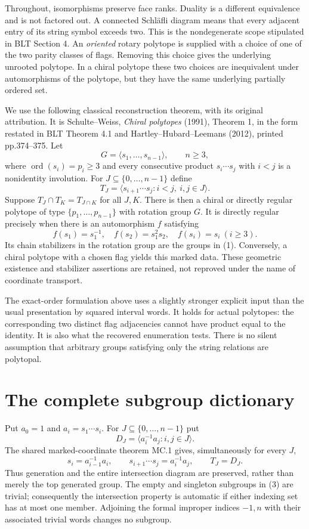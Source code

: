\documentclass[11pt]{article}
\theoremstyle{remark}\newtheorem{remark}[theorem]{Remark}
\newcommand{\ord}{\operatorname{ord}}
\begin{document}
Throughout, isomorphisms preserve face ranks. Duality is a different equivalence and is not factored out. A connected Schl\"afli diagram means that every adjacent entry of its string symbol exceeds two. This is the nondegenerate scope stipulated in BLT Section 4. An \emph{oriented} rotary polytope is supplied with a choice of one of the two parity classes of flags. Removing this choice gives the underlying unrooted polytope. In a chiral polytope these two choices are inequivalent under automorphisms of the polytope, but they have the same underlying partially ordered set.

We use the following classical reconstruction theorem, with its original attribution. It is Schulte--Weiss, \emph{Chiral polytopes} (1991), Theorem 1, in the form restated in BLT Theorem 4.1 and Hartley--Hubard--Leemans (2012), printed pp.374--375. Let
\[
G=\langle s_1,\ldots,s_{n-1}\rangle,\qquad n\geq3,
\]
where $\ord(s_i)=p_i\geq3$ and every consecutive product
$s_i\cdots s_j$ with $i<j$ is a nonidentity involution. For
$J\subseteq\{0,\ldots,n-1\}$ define
\[
T_J=\langle s_{i+1}\cdots s_j:i<j,\ i,j\in J\rangle.
\tag{1}
\]
Suppose $T_J\cap T_K=T_{J\cap K}$ for all $J,K$. There is then a chiral or directly regular polytope of type
$\{p_1,\ldots,p_{n-1}\}$ with rotation group $G$. It is directly regular precisely when there is an automorphism $f$ satisfying
\[
f(s_1)=s_1^{-1},\quad f(s_2)=s_1^2s_2,\quad f(s_i)=s_i\ (i\geq3).
\tag{2}
\]
Its chain stabilizers in the rotation group are the groups in (1). Conversely, a chiral polytope with a chosen flag yields this marked data. These geometric existence and stabilizer assertions are retained, not reproved under the name of coordinate transport.

The exact-order formulation above uses a slightly stronger explicit input than the usual presentation by squared interval words. It holds for actual polytopes: the corresponding two distinct flag adjacencies cannot have product equal to the identity. It is also what the recovered enumeration tests. There is no silent assumption that arbitrary groups satisfying only the string relations are polytopal.

\section{The complete subgroup dictionary}

Put $a_0=1$ and $a_i=s_1\cdots s_i$. For $J\subseteq\{0,\ldots,n-1\}$ put
\[
D_J=\langle a_i^{-1}a_j:i,j\in J\rangle.
\tag{3}
\]
The shared marked-coordinate theorem MC.1 gives, simultaneously for every $J$,
\[
s_i=a_{i-1}^{-1}a_i,\qquad
s_{i+1}\cdots s_j=a_i^{-1}a_j,\qquad T_J=D_J.
\tag{4}
\]
Thus generation and the entire intersection diagram are preserved, rather than merely the top generated group. The empty and singleton subgroups in (3) are trivial; consequently the intersection property is automatic if either indexing set has at most one member. Adjoining the formal improper indices $-1,n$ with their associated trivial words changes no subgroup.
\end{document}
